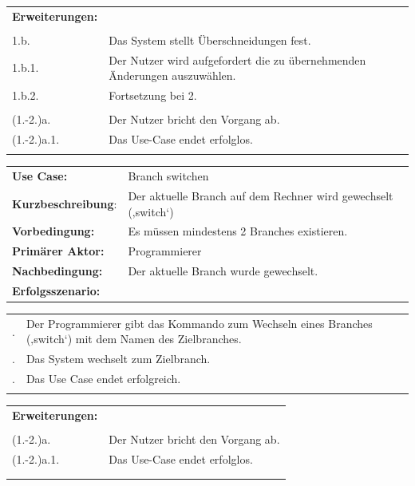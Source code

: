 \documentclass[a4paper]{article}
\begin{document}
\begin{tabularx}{\textwidth}{lX}
\textbf{Erweiterungen:}\\\\
\qquad \qquad 1.b. & Das System stellt Überschneidungen fest.\\
\qquad \qquad 1.b.1. & Der Nutzer wird aufgefordert die zu übernehmenden Änderungen auszuwählen.\\
\qquad \qquad 1.b.2. & Fortsetzung bei 2.\\\\
\qquad \qquad (1.-2.)a. & Der Nutzer bricht den Vorgang ab.\\
\qquad \qquad (1.-2.)a.1. & Das Use-Case endet erfolglos.\\\\

\end{tabularx}
\newpage
\begin{tabularx}{\textwidth}{lX}
\textbf{Use Case:} & Branch switchen\\
\textbf{Kurzbeschreibung}: &	Der aktuelle Branch auf dem Rechner wird gewechselt (‚switch‘)\\
\textbf{Vorbedingung:} & Es müssen mindestens 2 Branches existieren.\\
\textbf{Primärer Aktor:} & Programmierer\\
\textbf{Nachbedingung:} & Der aktuelle Branch wurde gewechselt.\\
\textbf{Erfolgsszenario:} &
\end{tabularx}

\begin{tabularx}{\textwidth}{lX}
\\
\qquad 1. & Der Programmierer gibt das Kommando zum Wechseln eines Branches (‚switch‘) mit dem Namen des Zielbranches.\\
\qquad 2. & Das System wechselt zum Zielbranch.\\
\qquad 3. & Das Use Case endet erfolgreich.\\\\\hline
\end{tabularx}

\begin{tabularx}{\textwidth}{lX}
\textbf{Erweiterungen:}\\\\
\qquad \qquad (1.-2.)a. & Der Nutzer bricht den Vorgang ab.\\
\qquad \qquad (1.-2.)a.1. & Das Use-Case endet erfolglos.\\\\\hline\hline\\
\end{tabularx}
\\
\end{document}
